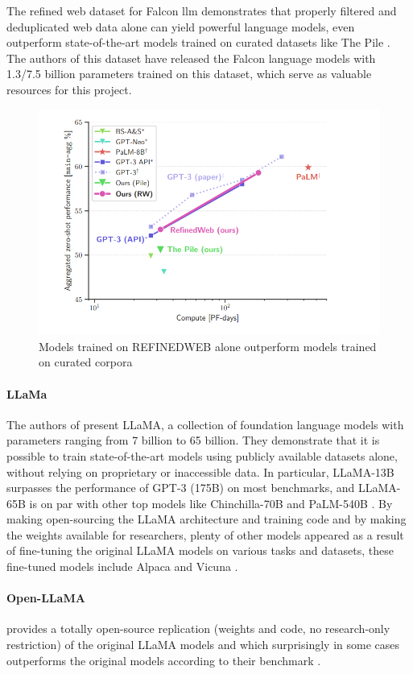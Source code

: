 \documentclass[a4paper,12pt]{article}
\begin{document}
The refined web dataset for Falcon llm \cite{falcondataset} demonstrates that properly filtered and deduplicated web data alone can yield powerful language models, 
even outperform state-of-the-art models trained on curated datasets like The Pile \cite{pile}. 
The authors of this dataset\cite{falcondataset} have released the Falcon \cite{falcon} language models with 1.3/7.5 billion parameters trained on this dataset, 
which serve as valuable resources for this project.

\begin{figure}[htbp]
	\centering
	\includegraphics[width=.5\linewidth]{figures/falcon.png}
	\caption{Models trained on REFINEDWEB \cite{falcondataset} alone outperform models trained on curated corpora}
	\label{fig:falcon}
\end{figure}

\paragraph*{LLaMa}
The authors of \cite{llama} present LLaMA, a collection of foundation language models with parameters ranging from 7 billion to 65 billion. 
They demonstrate that it is possible to train state-of-the-art models using publicly available datasets alone, without relying on proprietary or inaccessible data. 
In particular, LLaMA-13B surpasses the performance of GPT-3 (175B) \cite{gpt3} on most benchmarks, and LLaMA-65B is on par with other top models like Chinchilla-70B \cite{chinchilla} and PaLM-540B \cite{palm}. 
By making open-sourcing the LLaMA architecture and training code and by making the weights available for researchers, plenty of other models appeared as a result of fine-tuning the original LLaMA models on various tasks and datasets, 
these fine-tuned models include Alpaca \cite{alpaca} and Vicuna \cite{vicuna}.     

\paragraph*{Open-LLaMA} \cite{openllama} provides a totally open-source replication (weights and code, no research-only restriction) of the original LLaMA \cite{llama} models and which surprisingly in some cases outperforms the original models according to their benchmark \cite{openllama}.
\end{document}
